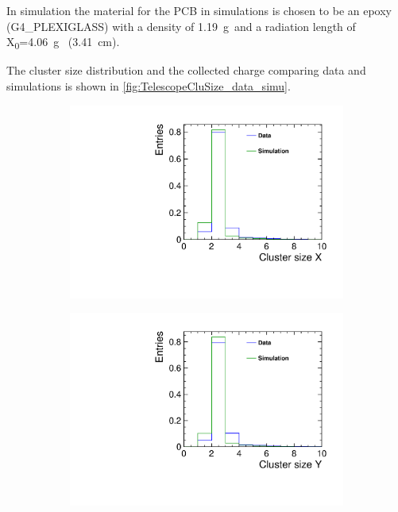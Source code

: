 In simulation the material for the PCB in simulations is chosen to be
an epoxy (G4\_PLEXIGLASS) with a density of 1.19~g~\inversecmcubic and
a radiation length of X\textsubscript{0}=4.06~g~\inversecmsquared
(3.41~cm).


The cluster size distribution and the collected charge comparing data
and simulations is shown in \cref{fig:TelescopeCluSize_data_simu}.

\begin{figure}[htbp] \centering
  \begin{subfigure}[b]{0.3\textwidth}
    \includegraphics[width=\textwidth]{figures/Telescope/biasedResiduals/clusterSizeX_telescope0_data_simu.pdf}
    \caption{}
  \end{subfigure}\hfill
  \begin{subfigure}[b]{0.3\textwidth}
    \includegraphics[width=\textwidth]{figures/Telescope/biasedResiduals/clusterSizeY_telescope0_data_simu.pdf}

\end{subfigure}
\end{figure}
